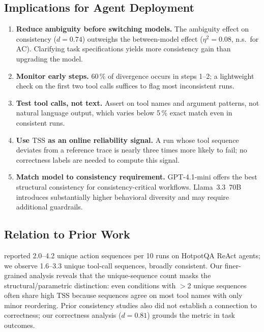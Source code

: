 \documentclass[letterpaper]{article}
\newcommand{\tss}{\mathrm{TSS}}
\newcommand{\ac}{\mathrm{AC}}
\begin{document}
\subsection{Implications for Agent Deployment}
\label{sec:implications}

\begin{enumerate}[leftmargin=1.5em]
  \item \textbf{Reduce ambiguity before switching models.} The ambiguity effect on
    consistency ($d = 0.74$) outweighs the between-model effect ($\eta^2 = 0.08$,
    n.s.\ for $\ac$). Clarifying task specifications yields more consistency gain
    than upgrading the model.
  \item \textbf{Monitor early steps.} 60\,\% of divergence occurs in steps 1--2;
    a lightweight check on the first two tool calls suffices to flag most
    inconsistent runs.
  \item \textbf{Test tool calls, not text.} Assert on tool names and argument
    patterns, not natural language output, which varies below 5\,\% exact match
    even in consistent runs.
  \item \textbf{Use $\tss$ as an online reliability signal.} A run whose tool
    sequence deviates from a reference trace is nearly three times more likely to
    fail; no correctness labels are needed to compute this signal.
  \item \textbf{Match model to consistency requirement.} GPT-4.1-mini offers the
    best structural consistency for consistency-critical workflows. Llama~3.3~70B
    introduces substantially higher behavioral diversity and may require
    additional guardrails.
\end{enumerate}

\subsection{Relation to Prior Work}

\citet{mehta2026disagree} reported 2.0--4.2 unique action sequences per 10 runs
on HotpotQA ReAct agents; we observe 1.6--3.3 unique tool-call sequences, broadly
consistent. Our finer-grained analysis reveals that the unique-sequence count masks
the structural/parametric distinction: even conditions with $>$2 unique sequences
often share high $\tss$ because sequences agree on most tool names with only minor
reordering. Prior consistency studies also did not establish a connection to
correctness; our correctness analysis ($d = 0.81$) grounds the metric in task
outcomes.
\end{document}
